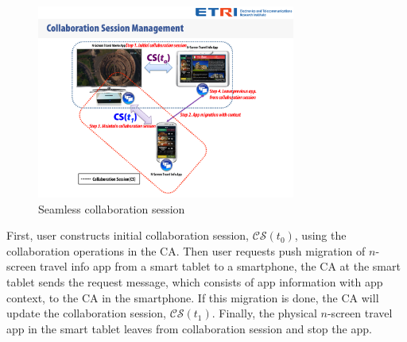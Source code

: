 \documentclass{sig-alternate}
\begin{document}
%
    \begin{figure}[htb] %
    \centering
    \includegraphics[width=8.5cm,keepaspectratio]{seamless}
    \caption{Seamless collaboration session}
    \label{fig:pushmigration}
    \end{figure}

First, user constructs initial collaboration session, $\mathcal{CS}(t_0)$, using the collaboration operations in the CA.
Then user requests push migration of $n$-screen travel info app from a smart tablet to a smartphone, the CA at the smart tablet sends the request message, which consists of app information with app context, to the CA in the smartphone. If this migration is done, the CA will update the collaboration session, $\mathcal{CS}(t_1)$. Finally, the physical $n$-screen travel app in the smart tablet leaves from collaboration session and stop the app. 
\end{document}
